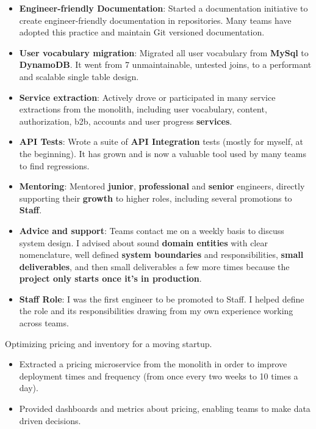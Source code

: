 \documentclass[10pt,a4paper,ragged2e,withhyper]{altacv}
\newcommand{\accentbold}[1]{\textbf{\textcolor{accent}{#1}}}
\begin{document}
\begin{paracol}{2}
{\begin{itemize}
\item \accentbold{Engineer-friendly Documentation}: Started a documentation initiative to create engineer-friendly documentation in repositories. Many teams have adopted this practice and maintain Git versioned documentation.
\item \accentbold{User vocabulary migration}: Migrated all user vocabulary from \accentbold{MySql} to \accentbold{DynamoDB}. It went from 7 unmaintainable, untested joins, to a performant and scalable single table design.
\item \accentbold{Service extraction}: Actively drove or participated in many service extractions from the monolith, including user vocabulary, content, authorization, b2b, accounts and user progress \accentbold{services}.
\item \accentbold{API Tests}: Wrote a suite of \accentbold{API Integration} tests (mostly for myself, at the beginning). It has grown and is now a valuable tool used by many teams to find regressions.
\item \accentbold{Mentoring}: Mentored \accentbold{junior}, \accentbold{professional} and \accentbold{senior} engineers, directly supporting their \accentbold{growth} to higher roles, including several promotions to \accentbold{Staff}.
\item \accentbold{Advice and support}: Teams contact me on a weekly basis to discuss system design. I advised about sound \accentbold{domain entities} with clear nomenclature, well defined \accentbold{system boundaries} and responsibilities, \accentbold{small deliverables}, and then small deliverables a few more times because the \accentbold{project only starts once it's in production}.
\item \accentbold{Staff Role}: I was the first engineer to be promoted to Staff. I helped define the role and its responsibilities drawing from my own experience working across teams.
\end{itemize}
}

\divider


{\RaggedRight
Optimizing pricing and inventory for a moving startup.

\medskip

\begin{itemize}
\item Extracted a pricing microservice from the monolith in order to improve deployment times and frequency (from once every two weeks to 10 times a day).
\item Provided dashboards and metrics about pricing, enabling teams to make data driven decisions.
\end{itemize}
}


\end{paracol}
\end{document}
